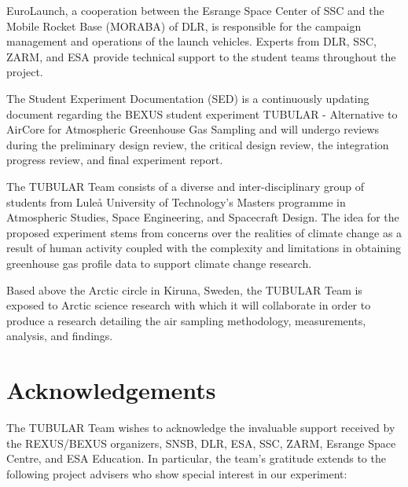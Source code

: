 \documentclass[a4paper,12pt,twoside]{article}
\begin{document}
EuroLaunch, a cooperation between the Esrange Space Center of SSC and the Mobile Rocket Base (MORABA) of DLR, is responsible for the campaign management and operations of the launch vehicles. Experts from DLR, SSC, ZARM, and ESA provide
technical support to the student teams throughout the project.

The Student Experiment Documentation (SED) is a continuously updating document regarding the BEXUS student experiment TUBULAR - Alternative to AirCore for Atmospheric Greenhouse Gas Sampling and will undergo reviews during the preliminary design review, the critical design review, the integration progress review, and final experiment report.

The TUBULAR Team consists of a diverse and inter-disciplinary group of students from Luleå University of Technology's Masters programme in Atmospheric Studies, Space Engineering, and Spacecraft Design. The idea for the proposed experiment stems from concerns over the realities of climate change as a result of human activity coupled with the complexity and limitations in obtaining greenhouse gas profile data to support climate change research.

Based above the Arctic circle in Kiruna, Sweden, the TUBULAR Team is exposed to Arctic science research with which it will collaborate in order to produce a research detailing the air sampling methodology, measurements, analysis, and findings.



\newpage
\section*{Acknowledgements} \markboth{}{}

The TUBULAR Team wishes to acknowledge the invaluable support received by the REXUS/BEXUS organizers, SNSB, DLR, ESA, SSC, ZARM, Esrange Space Centre, and ESA Education. In particular, the team's gratitude extends to the following project advisers who show special interest in our experiment:
\end{document}
